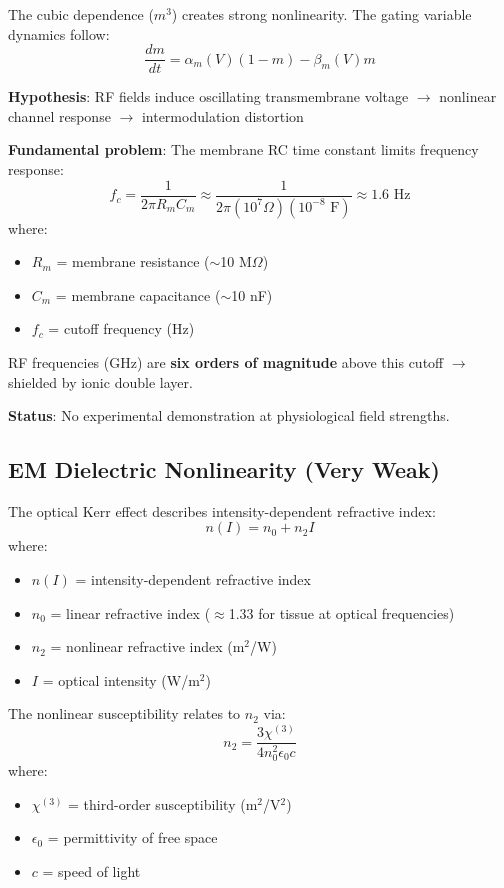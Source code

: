\begin{scope}[shift={(8,0)}]
The cubic dependence ($m^3$) creates strong nonlinearity. The gating variable dynamics follow:
\begin{equation}
\label{eq:gating-dynamics}
\frac{dm}{dt} = \alpha_m(V)(1-m) - \beta_m(V)m
\end{equation}

\textbf{Hypothesis}: RF fields induce oscillating transmembrane voltage $\rightarrow$ nonlinear channel response $\rightarrow$ intermodulation distortion

\textbf{Fundamental problem}: The membrane RC time constant limits frequency response:
\begin{equation}
\label{eq:rc-cutoff}
f_c = \frac{1}{2\pi R_m C_m} \approx \frac{1}{2\pi (10^7 \Omega)(10^{-8} \text{ F})} \approx 1.6 \text{ Hz}
\end{equation}
where:
\begin{itemize}
\item $R_m$ = membrane resistance ($\sim$10 M$\Omega$)
\item $C_m$ = membrane capacitance ($\sim$10 nF)
\item $f_c$ = cutoff frequency (Hz)
\end{itemize}

RF frequencies (GHz) are \textbf{six orders of magnitude} above this cutoff $\rightarrow$ shielded by ionic double layer.

\textbf{Status}: No experimental demonstration at physiological field strengths.

\subsection{EM Dielectric Nonlinearity (Very Weak)}

The optical Kerr effect describes intensity-dependent refractive index:
\begin{equation}
\label{eq:kerr-effect}
n(I) = n_0 + n_2 I
\end{equation}
where:
\begin{itemize}
\item $n(I)$ = intensity-dependent refractive index
\item $n_0$ = linear refractive index ($\approx$1.33 for tissue at optical frequencies)
\item $n_2$ = nonlinear refractive index (m$^2$/W)
\item $I$ = optical intensity (W/m$^2$)
\end{itemize}

The nonlinear susceptibility relates to $n_2$ via:
\begin{equation}
\label{eq:chi3-relation}
n_2 = \frac{3\chi^{(3)}}{4n_0^2\epsilon_0 c}
\end{equation}
where:
\begin{itemize}
\item $\chi^{(3)}$ = third-order susceptibility (m$^2$/V$^2$)
\item $\epsilon_0$ = permittivity of free space
\item $c$ = speed of light
\end{itemize}


\end{scope}
